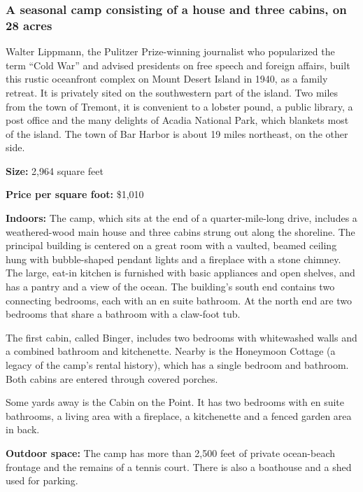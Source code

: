 \hypertarget{a-seasonal-camp-consisting-of-a-house-and-three-cabins-on-28-acres}{%
\subsubsection{\texorpdfstring{\textbf{A seasonal camp consisting of a
house and three cabins, on 28
acres}}{A seasonal camp consisting of a house and three cabins, on 28 acres}}\label{a-seasonal-camp-consisting-of-a-house-and-three-cabins-on-28-acres}}

Walter Lippmann, the Pulitzer Prize-winning journalist who popularized
the term ``Cold War'' and advised presidents on free speech and foreign
affairs, built this rustic oceanfront complex on Mount Desert Island in
1940, as a family retreat. It is privately sited on the southwestern
part of the island. Two miles from the town of Tremont, it is convenient
to a lobster pound, a public library, a post office and the many
delights of Acadia National Park, which blankets most of the island. The
town of Bar Harbor is about 19 miles northeast, on the other side.

\textbf{Size:} 2,964 square feet

\textbf{Price per square foot:} \$1,010

\textbf{Indoors:} The camp, which sits at the end of a quarter-mile-long
drive, includes a weathered-wood main house and three cabins strung out
along the shoreline. The principal building is centered on a great room
with a vaulted, beamed ceiling hung with bubble-shaped pendant lights
and a fireplace with a stone chimney. The large, eat-in kitchen is
furnished with basic appliances and open shelves, and has a pantry and a
view of the ocean. The building's south end contains two connecting
bedrooms, each with an en suite bathroom. At the north end are two
bedrooms that share a bathroom with a claw-foot tub.

The first cabin, called Binger, includes two bedrooms with whitewashed
walls and a combined bathroom and kitchenette. Nearby is the Honeymoon
Cottage (a legacy of the camp's rental history), which has a single
bedroom and bathroom. Both cabins are entered through covered porches.

Some yards away is the Cabin on the Point. It has two bedrooms with en
suite bathrooms, a living area with a fireplace, a kitchenette and a
fenced garden area in back.

\textbf{Outdoor space:} The camp has more than 2,500 feet of private
ocean-beach frontage and the remains of a tennis court. There is also a
boathouse and a shed used for parking.

